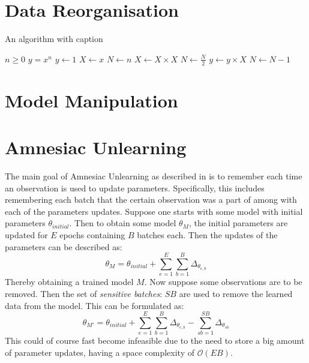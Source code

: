\section{Data Reorganisation}



\begin{algorithm}
\caption{An algorithm with caption}\label{alg:cap}
\begin{algorithmic}
\Require $n \geq 0$
\Ensure $y = x^n$
\State $y \gets 1$
\State $X \gets x$
\State $N \gets n$
    \State $X \gets X \times X$
    \State $N \gets \frac{N}{2}$  
    \State $y \gets y \times X$
    \State $N \gets N - 1$
\EndIf
\EndWhile
\end{algorithmic}
\end{algorithm}


\section{Model Manipulation}






\section{Amnesiac Unlearning}

The main goal of Amnesiac Unlearning as described in \cite{graves_amnesiac_2020} is to remember each time an observation is used to update parameters. Specifically, this includes remembering each batch that the certain observation was a part of among with each of the parameters updates. Suppose one starts with some  model with initial parameters $\theta_{initial}$. Then to obtain some model $\theta_{M}$, the initial parameters are updated for $E$ epochs containing $B$ batches each. Then the updates of the parameters can be described as:
\[
    \theta_M = \theta_{initial} + \sum^E_{e=1} \sum^B_{b=1} \Delta_{\theta_{e,b}}
\]
Thereby obtaining a trained model $M$. Now suppose some observations are to be removed. Then the set of \textit{sensitive batches}: $SB$ are used to remove the learned data from the model. This can be formulated as:
\[
    \theta_{M'} = \theta_{initial} + \sum^E_{e=1} \sum^B_{b=1} \Delta_{\theta_{e,b}} - \sum_{sb=1}^{SB} \Delta_{\theta_{sb}}
\]
This could of course fast become infeasible due to the need to store a big amount of parameter updates, having a space complexity of $\mathcal{O}(EB)$.




